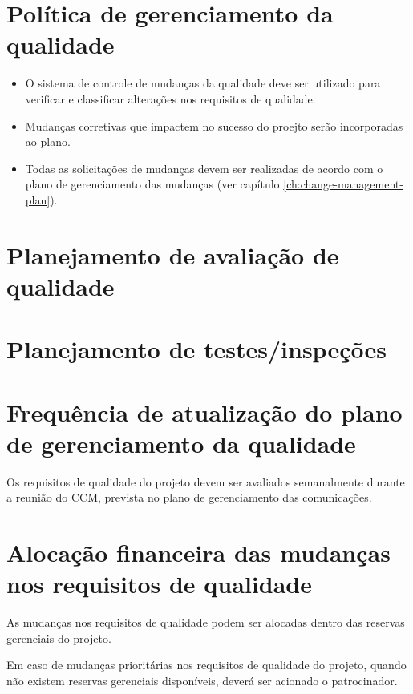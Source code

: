 \section{Política de gerenciamento da qualidade}

\begin{itemize}
	\item O sistema de controle de mudanças da qualidade deve ser utilizado para verificar e classificar alterações nos requisitos de qualidade.
	\item Mudanças corretivas que impactem no sucesso do proejto serão incorporadas ao plano.
	\item Todas as solicitações de mudanças devem ser realizadas de acordo com o plano de gerenciamento das mudanças (ver capítulo \ref{ch:change-management-plan}).
\end{itemize}

\section{Planejamento de avaliação de qualidade}


\section{Planejamento de testes/inspeções}


\section{Frequência de atualização do plano de gerenciamento da qualidade}

Os requisitos de qualidade do projeto devem ser avaliados semanalmente durante a reunião do CCM, prevista no plano de gerenciamento das comunicações.

\section{Alocação financeira das mudanças nos requisitos de qualidade}

As mudanças nos requisitos de qualidade podem ser alocadas dentro das reservas gerenciais do projeto.

Em caso de mudanças prioritárias nos requisitos de qualidade do projeto, quando não existem reservas gerenciais disponíveis, deverá ser acionado o patrocinador.

